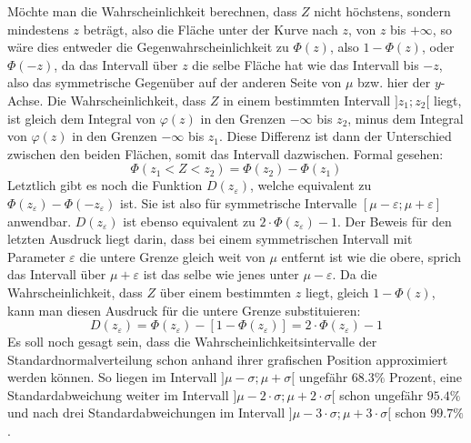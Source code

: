 M\"{o}chte man die Wahrscheinlichkeit berechnen, dass $Z$ nicht h\"{o}chstens, sondern mindestens $z$ betr\"{a}gt, also die Fl\"{a}che unter der Kurve nach $z$, von $z$ bis $+\infty$, so w\"{a}re dies entweder die Gegenwahrscheinlichkeit zu $\Phi(z)$, also $1 - \Phi(z)$, oder $\Phi(-z)$, da das Intervall \"{u}ber $z$ die selbe Fl\"{a}che hat wie das Intervall bis $-z$, also das symmetrische Gegen\"{u}ber auf der anderen Seite von $\mu$ bzw. hier der $y$-Achse. Die Wahrscheinlichkeit, dass $Z$ in einem bestimmten Intervall $]z_{1}; z_{2}[$ liegt, ist gleich dem Integral von $\varphi(z)$ in den Grenzen $-\infty$ bis $z_2$, minus dem Integral von $\varphi(z)$ in den Grenzen $-\infty$ bis $z_1$. Diese Differenz ist dann der Unterschied zwischen den beiden Fl\"{a}chen, somit das Intervall dazwischen. Formal gesehen: $$\Phi(z_{1} < Z < z_{2}) = \Phi(z_{2}) - \Phi(z_{1})$$  Letztlich gibt es noch die Funktion $D(z_{\varepsilon})$, welche equivalent zu $\Phi(z_{\varepsilon}) - \Phi(-z_{\varepsilon})$ ist. Sie ist also f\"{u}r symmetrische Intervalle $[\mu - \varepsilon ;  \mu + \varepsilon]$ anwendbar. $D(z_{\varepsilon})$ ist ebenso equivalent zu $2 \cdot \Phi(z_{\varepsilon}) - 1$. Der Beweis f\"{u}r den letzten Ausdruck liegt darin, dass bei einem symmetrischen Intervall mit Parameter $\varepsilon$ die untere Grenze gleich weit von $\mu$ entfernt ist wie die obere, sprich das Intervall \"{u}ber $\mu + \varepsilon$ ist das selbe wie jenes unter $\mu - \varepsilon$. Da die Wahrscheinlichkeit, dass $Z$ \"{u}ber einem bestimmten $z$ liegt, gleich $1 - \Phi(z)$, kann man diesen Ausdruck f\"{u}r die untere Grenze substituieren: $$D(z_{\varepsilon}) = \Phi(z_{\varepsilon}) - [1 - \Phi(z_{\varepsilon})] = 2 \cdot \Phi(z_{\varepsilon}) - 1$$ Es soll noch gesagt sein, dass die Wahrscheinlichkeitsintervalle der Standardnormalverteilung schon anhand ihrer grafischen Position approximiert werden k\"{o}nnen. So liegen im Intervall $]\mu - \sigma ; \mu + \sigma[$ ungef\"{a}hr $68.3 \%$ Prozent, eine Standardabweichung weiter im Intervall $]\mu - 2 \cdot \sigma ; \mu + 2 \cdot \sigma[$ schon ungef\"{a}hr $95.4 \%$ und nach drei Standardabweichungen im Intervall $]\mu - 3 \cdot \sigma ; \mu + 3 \cdot \sigma[$ schon $99.7 \%$.

